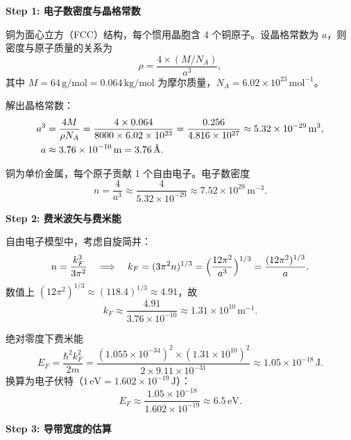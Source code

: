 \begin{derivationbox}[标准解题过程]
\textbf{Step 1: 电子数密度与晶格常数}

铜为面心立方（FCC）结构，每个惯用晶胞含 4 个铜原子。设晶格常数为 $a$，则密度与原子质量的关系为
\begin{equation}
\rho = \frac{4\times(M/N_A)}{a^3},
\end{equation}
其中 $M=64\,\mathrm{g/mol}=0.064\,\mathrm{kg/mol}$ 为摩尔质量，$N_A=6.02\times10^{23}\,\mathrm{mol^{-1}}$。

解出晶格常数：
\begin{align}
a^3 &= \frac{4M}{\rho N_A}
= \frac{4\times0.064}{8000\times6.02\times10^{23}}
= \frac{0.256}{4.816\times10^{27}}
\approx 5.32\times10^{-29}\,\mathrm{m^3}, \notag\\
a &\approx 3.76\times10^{-10}\,\mathrm{m} = 3.76\,\text{\AA}.
\end{align}

铜为单价金属，每个原子贡献 1 个自由电子。电子数密度
\begin{equation}
n = \frac{4}{a^3} \approx \frac{4}{5.32\times10^{-29}} \approx 7.52\times10^{28}\,\mathrm{m^{-3}}.
\end{equation}

\textbf{Step 2: 费米波矢与费米能}

自由电子模型中，考虑自旋简并：
\begin{equation}
n = \frac{k_F^3}{3\pi^2}
\quad\Longrightarrow\quad
k_F = (3\pi^2 n)^{1/3} = \Bigl(\frac{12\pi^2}{a^3}\Bigr)^{1/3} = \frac{(12\pi^2)^{1/3}}{a}.
\end{equation}
数值上 $(12\pi^2)^{1/3}\approx(118.4)^{1/3}\approx 4.91$，故
\begin{equation}
k_F \approx \frac{4.91}{3.76\times10^{-10}} \approx 1.31\times10^{10}\,\mathrm{m^{-1}}.
\end{equation}

绝对零度下费米能
\begin{equation}
E_F = \frac{\hbar^2k_F^2}{2m}
= \frac{(1.055\times10^{-34})^2\times(1.31\times10^{10})^2}{2\times9.11\times10^{-31}}
\approx 1.05\times10^{-18}\,\mathrm{J}.
\end{equation}
换算为电子伏特（$1\,\mathrm{eV}=1.602\times10^{-19}\,\mathrm{J}$）：
\begin{equation}
\boxed{E_F \approx \frac{1.05\times10^{-18}}{1.602\times10^{-19}} \approx 6.5\,\mathrm{eV}.}
\end{equation}

\textbf{Step 3: 导带宽度的估算}


\end{derivationbox}
